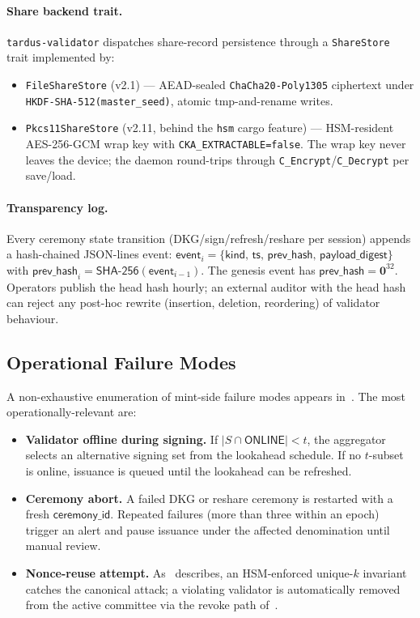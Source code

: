\paragraph{Share backend trait.} \texttt{tardus-validator} dispatches
share-record persistence through a \texttt{ShareStore} trait
implemented by:
\begin{itemize}[leftmargin=2em,itemsep=0pt]
  \item \texttt{FileShareStore} (v2.1) — AEAD-sealed
        \texttt{ChaCha20-Poly1305} ciphertext under
        \texttt{HKDF-SHA-512(master\_seed)}, atomic
        tmp-and-rename writes.
  \item \texttt{Pkcs11ShareStore} (v2.11, behind the \texttt{hsm}
        cargo feature) — HSM-resident AES-256-GCM wrap key with
        \texttt{CKA\_EXTRACTABLE=false}. The wrap key never leaves
        the device; the daemon round-trips through
        \texttt{C\_Encrypt}/\texttt{C\_Decrypt} per save/load.
\end{itemize}

\paragraph{Transparency log.} Every ceremony state transition
(DKG/sign/refresh/reshare per session) appends a hash-chained
JSON-lines event:
$\mathsf{event}_i = \{\mathsf{kind},\,\mathsf{ts},\,\mathsf{prev\_hash},\,\mathsf{payload\_digest}\}$
with $\mathsf{prev\_hash}_i = \mathsf{SHA\text{-}256}(\mathsf{event}_{i-1})$.
The genesis event has $\mathsf{prev\_hash} = \mathbf{0}^{32}$.
Operators publish the head hash hourly; an external auditor with the
head hash can reject any post-hoc rewrite (insertion, deletion,
reordering) of validator behaviour.

\subsection{Operational Failure Modes}
\label{sec:mint-failures}

A non-exhaustive enumeration of mint-side failure modes appears in~. The most operationally-relevant are:

\begin{itemize}[leftmargin=2em,itemsep=0pt]
  \item \textbf{Validator offline during signing.} If $|S \cap \mathsf{ONLINE}| < t$, the aggregator selects an alternative signing set from the lookahead schedule. If no $t$-subset is online, issuance is queued until the lookahead can be refreshed.
  \item \textbf{Ceremony abort.} A failed DKG or reshare ceremony is restarted with a fresh $\mathsf{ceremony\_id}$. Repeated failures (more than three within an epoch) trigger an alert and pause issuance under the affected denomination until manual review.
  \item \textbf{Nonce-reuse attempt.} As~ describes, an HSM-enforced unique-$k$ invariant catches the canonical attack; a violating validator is automatically removed from the active committee via the revoke path of~.
\end{itemize}
